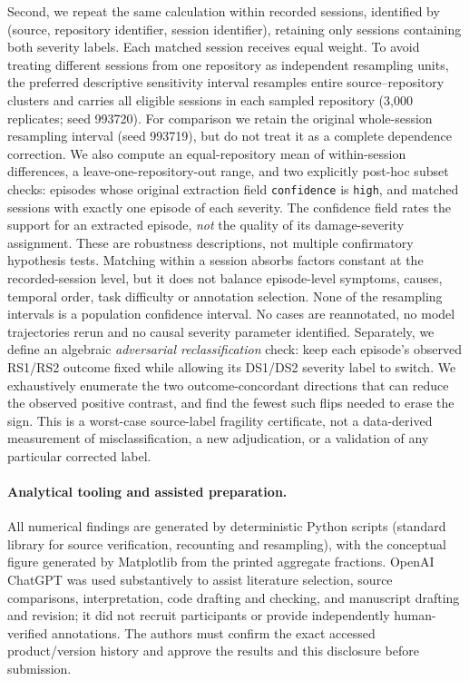 Second, we repeat the same calculation within recorded sessions, identified by (source, repository identifier, session identifier), retaining only sessions containing both severity labels. Each matched session receives equal weight. To avoid treating different sessions from one repository as independent resampling units, the preferred descriptive sensitivity interval resamples entire source--repository clusters and carries all eligible sessions in each sampled repository (3,000 replicates; seed 993720). For comparison we retain the original whole-session resampling interval (seed 993719), but do not treat it as a complete dependence correction. We also compute an equal-repository mean of within-session differences, a leave-one-repository-out range, and two explicitly post-hoc subset checks: episodes whose original extraction field \texttt{confidence} is \texttt{high}, and matched sessions with exactly one episode of each severity. The confidence field rates the support for an extracted episode, \emph{not} the quality of its damage-severity assignment. These are robustness descriptions, not multiple confirmatory hypothesis tests. Matching within a session absorbs factors constant at the recorded-session level, but it does not balance episode-level symptoms, causes, temporal order, task difficulty or annotation selection. None of the resampling intervals is a population confidence interval. No cases are reannotated, no model trajectories rerun and no causal severity parameter identified. Separately, we define an algebraic \emph{adversarial reclassification} check: keep each episode's observed RS1/RS2 outcome fixed while allowing its DS1/DS2 severity label to switch. We exhaustively enumerate the two outcome-concordant directions that can reduce the observed positive contrast, and find the fewest such flips needed to erase the sign. This is a worst-case source-label fragility certificate, not a data-derived measurement of misclassification, a new adjudication, or a validation of any particular corrected label.

\paragraph{Analytical tooling and assisted preparation.} All numerical findings are generated by deterministic Python scripts (standard library for source verification, recounting and resampling), with the conceptual figure generated by Matplotlib from the printed aggregate fractions. OpenAI ChatGPT was used substantively to assist literature selection, source comparisons, interpretation, code drafting and checking, and manuscript drafting and revision; it did not recruit participants or provide independently human-verified annotations. The authors must confirm the exact accessed product/version history and approve the results and this disclosure before submission.


